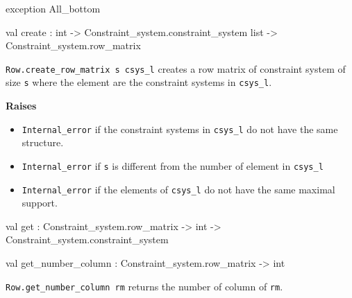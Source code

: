 \begin{ocamldocsigend}


\label{exception:Constraint-underscoresystem.Row.All-underscorebottom}\begin{ocamldoccode}
exception All_bottom
\end{ocamldoccode}


\label{val:Constraint-underscoresystem.Row.create}\begin{ocamldoccode}
val create :
  int ->
  Constraint_system.constraint_system list -> Constraint_system.row_matrix
\end{ocamldoccode}
\begin{ocamldocdescription}
{\tt{Row.create\_row\_matrix s csys\_l}} creates a row matrix of constraint system of size {\tt{s}} where 
    the element are the constraint systems in {\tt{csys\_l}}.

{\bf Raises} \begin{itemize}
\item {\tt{Internal\_error}} if the constraint systems in {\tt{csys\_l}} do not have the same structure. \highdebug 
\item {\tt{Internal\_error}} if {\tt{s}} is different from the number of element in {\tt{csys\_l}}
\item {\tt{Internal\_error}} if the elements of {\tt{csys\_l}} do not have the same maximal support.
\end{itemize}



\end{ocamldocdescription}


\label{val:Constraint-underscoresystem.Row.get}\begin{ocamldoccode}
val get :
  Constraint_system.row_matrix -> int -> Constraint_system.constraint_system
\end{ocamldoccode}


\label{val:Constraint-underscoresystem.Row.get-underscorenumber-underscorecolumn}\begin{ocamldoccode}
val get_number_column : Constraint_system.row_matrix -> int
\end{ocamldoccode}
\begin{ocamldocdescription}
{\tt{Row.get\_number\_column rm}} returns the number of column of {\tt{rm}}.


\end{ocamldocdescription}



\end{ocamldocsigend}
